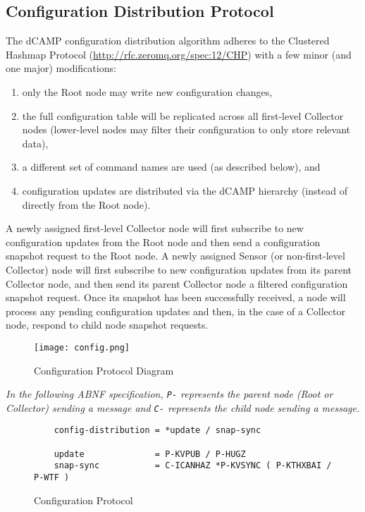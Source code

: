 \subsection{Configuration Distribution Protocol}

The dCAMP configuration distribution algorithm adheres to the Clustered Hashmap Protocol
(\url{http://rfc.zeromq.org/spec:12/CHP}) with a few minor (and one major) modifications:

\begin{enumerate}
\item only the Root node may write new configuration changes,
\item the full configuration table will be replicated across all first-level Collector nodes (lower-level nodes may
      filter their configuration to only store relevant data),
\item a different set of command names are used (as described below), and
\item configuration updates are distributed via the dCAMP hierarchy (instead of directly from the Root node).
\end{enumerate}

A newly assigned first-level Collector node will first subscribe to new configuration updates from the Root node and
then send a configuration snapshot request to the Root node. A newly assigned Sensor (or non-first-level Collector) node
will first subscribe to new configuration updates from its parent Collector node, and then send its parent Collector
node a filtered configuration snapshot request. Once its snapshot has been successfully received, a node will process
any pending configuration updates and then, in the case of a Collector node, respond to child node snapshot requests.

\begin{figure}[b]
    \centering
    \texttt{[image: config.png]}
    \caption{Configuration Protocol Diagram}
    \label{fig:proto_config_image}
\end{figure}

\textit{In the following ABNF specification, \texttt{P-} represents the parent node (Root or Collector) sending a
message and \texttt{C-} represents the child node sending a message.}

\begin{figure}[h]
    \centering
    \begin{lstlisting}
    config-distribution = *update / snap-sync
    
    update              = P-KVPUB / P-HUGZ
    snap-sync           = C-ICANHAZ *P-KVSYNC ( P-KTHXBAI / P-WTF )
    \end{lstlisting}
    \caption{Configuration Protocol}
    \label{fig:proto_config_image}
\end{figure}

